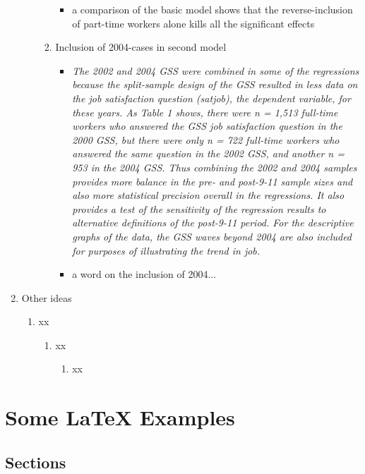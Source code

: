 \documentclass[a4paper,man,natbib]{apa6}
\begin{document}
\begin{enumerate}
\begin{enumerate}
\begin{enumerate}
\begin{itemize}
				\item 
				a comparison of the basic model shows that the reverse-inclusion of part-time workers alone kills all the significant effects
			\end{itemize}
			\item Inclusion of 2004-cases in second model
			\begin{itemize}
				\item 
				\textit{The 2002 and 2004 GSS were combined in some of the regressions because the split-sample design of the GSS resulted in less data on the job satisfaction question (satjob), the dependent variable, for these years. As Table 1 shows, there were n = 1,513 full-time workers who answered the GSS job satisfaction question in the 2000 GSS, but there were only n = 722 full-time workers who answered the same question in the 2002 GSS, and another n = 953 in the 2004 GSS. Thus combining the 2002 and 2004 samples provides more balance in the pre- and post-9-11 sample sizes and also more statistical precision overall in the regressions. It also provides a test of the sensitivity of the regression results to alternative definitions of the post-9-11 period. For the descriptive graphs of the data, the GSS waves beyond 2004 are also included for purposes of illustrating the trend in job.}
				\item 
				a word on the inclusion of 2004...
			\end{itemize}
		\end{enumerate}
	\end{enumerate}

	\item Other ideas
	\begin{enumerate}
		\item xx
		\begin{enumerate}
			\item xx
			\begin{enumerate}
				\item xx
			\end{enumerate}
		\end{enumerate}
	\end{enumerate}
\end{enumerate}

\section{Some \LaTeX{} Examples}
\label{sec:examples}

\subsection{Sections}
\end{document}
